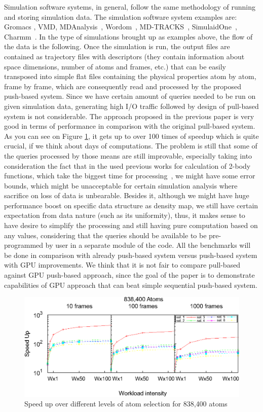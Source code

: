 \documentclass[11pt,a4paper]{report}
\begin{document}
Simulation software systems, in general, follow the same methodology of running and storing simulation data. The simulation software system examples are: Gromacs \cite{GROMACS4}, VMD\cite{VMD}, MDAnalysis~\cite{MDAnalysis}, Wordom~\cite{wordom}, MD-TRACKS~\cite{MDtracks}, SimulaidOne~\cite{Simulaid}, Charmm~\cite{CHARMM}. In the type of simulations brought up as examples above, the flow of the data is the following. Once the simulation is run, the output files are contained as trajectory files with descriptors (they contain information about space dimensions, number of atoms and frames, etc.) that can be easily transposed into simple flat files containing the physical properties atom by atom, frame by frame, which are consequently read and processed by the proposed push-based system. Since we have certain amount of queries needed to be run on given simulation data, generating high I/O traffic followed by design of pull-based system is not considerable. The approach proposed in the previous paper is very good in terms of performance in comparison with the original pull-based system\cite{mainPaper}. As you can see on Figure \ref{fg:sample_estimation_old_paper}, it gets up to over 100 times of speedup which is quite crucial, if we think about days of computations. The problem is still that some of the queries processed by those means are still improvable, especially taking into consideration the fact that in the used previous works for calculation of 2-body functions, which take the biggest time for processing~\cite{ytu:icde09, EDBT12}, we might have some error bounds, which might be unacceptable for certain simulation analysis where sacrifice on loss of data is unbearable. Besides it, although we might have huge performance boost on specific data structure as density map, we still have certain expectation from data nature (such as its uniformity), thus, it makes sense to have desire to simplify the processing and still having pure computation based on any values, considering that the queries should be available to be pre-programmed by user in a separate module of the code. All the benchmarks will be done in comparison with already push-based system versus push-based system with GPU improvements. We think that it is  not fair to compare pull-based against GPU push-based approach, since the goal of the paper is to demonstrate capabilities of GPU approach that can beat simple sequential push-based system.

\begin{figure}
 \centerline{ \includegraphics[width=0.5\columnwidth]{images/speedup838K-pomalo-za-4.eps} }
 \caption{ Speed up over different levels of atom selection for 838,400 atoms}
 \label{fg:sample_estimation_old_paper}
\end{figure}
\end{document}
